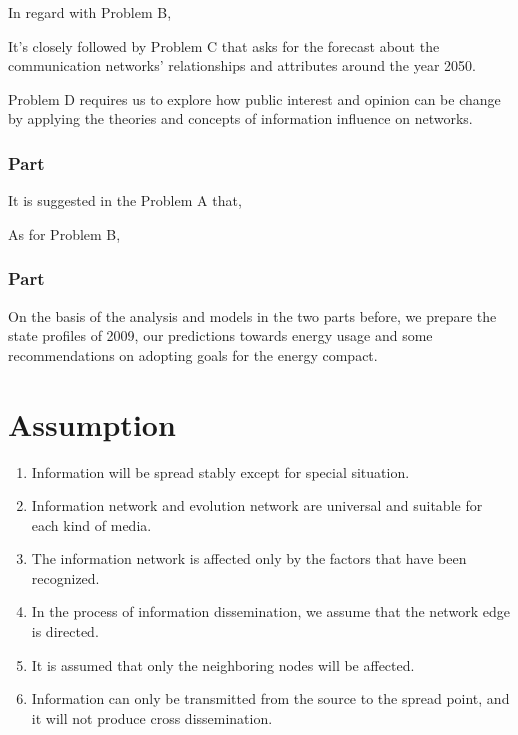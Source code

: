 \documentclass[a4paper,11pt]{article}
\begin{document}
\par In regard with Problem B, 

\par It's closely followed by Problem C that asks for the forecast about the communication networks' relationships and attributes around the year 2050. 

\par Problem D requires us to explore how public interest and opinion can be change by applying the theories and concepts of information influence on networks. 

\subsubsection{Part \uppercase\expandafter{}}
\par It is suggested in the Problem A that,

\par As for Problem B, 

\subsubsection{Part \uppercase\expandafter{}}
\par On the basis of the analysis and models in the two parts before, we prepare the state profiles of 2009, our predictions towards energy usage and some recommendations on adopting goals for the energy compact.


\section{Assumption}
\begin{enumerate}%
\renewcommand{\labelenumi}{(\theenumi)}
    \item Information will be spread stably except for special situation.
    \item Information network and evolution network are universal and suitable for each kind of media.
    \item The information network is affected  only by the factors that have been recognized.
    \item In the process of information dissemination, we assume that the network edge is directed.
    \item It is assumed that only the neighboring nodes will be affected.
    \item Information can only be transmitted from the source to the spread point, and it will not produce cross dissemination.
\end{enumerate}
\end{document}
